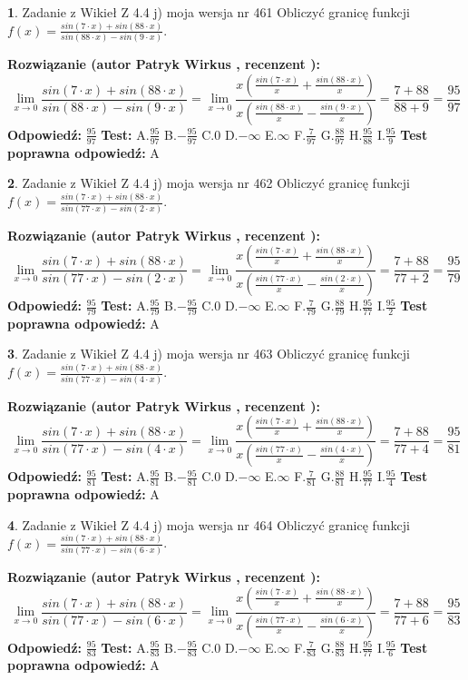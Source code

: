 \documentclass[12pt, a4paper]{article}
\theoremstyle{definition} %
\newtheorem{zad}{}
\newcommand{\zadStart}[1]{\begin{zad}#1\newline}
\newcommand{\zadStop}{\end{zad}}
\newcommand{\rozwStart}[2]{\noindent \textbf{Rozwiązanie (autor #1 , recenzent #2): }\newline}
\newcommand{\rozwStop}{\newline}
\newcommand{\odpStart}{\noindent \textbf{Odpowiedź:}\newline}
\newcommand{\odpStop}{\newline}
\newcommand{\testStart}{\noindent \textbf{Test:}\newline}
\newcommand{\testStop}{\newline}
\newcommand{\kluczStart}{\noindent \textbf{Test poprawna odpowiedź:}\newline}
\newcommand{\kluczStop}{\newline}
\begin{document}
\zadStart{Zadanie z Wikieł Z 4.4 j) moja wersja nr 461}
Obliczyć granicę funkcji $f(x)=\frac{sin(7\cdot x) +sin(88\cdot x)}{sin(88\cdot x) -sin(9\cdot x)}$.
\zadStop
\rozwStart{Patryk Wirkus}{}
$$\lim\limits_{x\to 0}\frac{sin(7\cdot x) +sin(88\cdot x)}{sin(88\cdot x) -sin(9\cdot x)}=\lim\limits_{x\to 0}\frac{x(\frac{sin(7\cdot x)}{x}+\frac{sin(88\cdot x)}{x})}{x(\frac{sin(88\cdot x)}{x}-\frac{sin(9\cdot x)}{x})}=\frac{7+88}{88+9} = \frac{95}{97}$$
\rozwStop
\odpStart
$\frac{95}{97}$
\odpStop
\testStart
A.$\frac{95}{97}$
B.$-\frac{95}{97}$
C.$0$
D.$-\infty$
E.$\infty$
F.$\frac{7}{97}$
G.$\frac{88}{97}$
H.$\frac{95}{88}$
I.$\frac{95}{9}$
\testStop
\kluczStart
A
\kluczStop



\zadStart{Zadanie z Wikieł Z 4.4 j) moja wersja nr 462}
Obliczyć granicę funkcji $f(x)=\frac{sin(7\cdot x) +sin(88\cdot x)}{sin(77\cdot x) -sin(2\cdot x)}$.
\zadStop
\rozwStart{Patryk Wirkus}{}
$$\lim\limits_{x\to 0}\frac{sin(7\cdot x) +sin(88\cdot x)}{sin(77\cdot x) -sin(2\cdot x)}=\lim\limits_{x\to 0}\frac{x(\frac{sin(7\cdot x)}{x}+\frac{sin(88\cdot x)}{x})}{x(\frac{sin(77\cdot x)}{x}-\frac{sin(2\cdot x)}{x})}=\frac{7+88}{77+2} = \frac{95}{79}$$
\rozwStop
\odpStart
$\frac{95}{79}$
\odpStop
\testStart
A.$\frac{95}{79}$
B.$-\frac{95}{79}$
C.$0$
D.$-\infty$
E.$\infty$
F.$\frac{7}{79}$
G.$\frac{88}{79}$
H.$\frac{95}{77}$
I.$\frac{95}{2}$
\testStop
\kluczStart
A
\kluczStop



\zadStart{Zadanie z Wikieł Z 4.4 j) moja wersja nr 463}
Obliczyć granicę funkcji $f(x)=\frac{sin(7\cdot x) +sin(88\cdot x)}{sin(77\cdot x) -sin(4\cdot x)}$.
\zadStop
\rozwStart{Patryk Wirkus}{}
$$\lim\limits_{x\to 0}\frac{sin(7\cdot x) +sin(88\cdot x)}{sin(77\cdot x) -sin(4\cdot x)}=\lim\limits_{x\to 0}\frac{x(\frac{sin(7\cdot x)}{x}+\frac{sin(88\cdot x)}{x})}{x(\frac{sin(77\cdot x)}{x}-\frac{sin(4\cdot x)}{x})}=\frac{7+88}{77+4} = \frac{95}{81}$$
\rozwStop
\odpStart
$\frac{95}{81}$
\odpStop
\testStart
A.$\frac{95}{81}$
B.$-\frac{95}{81}$
C.$0$
D.$-\infty$
E.$\infty$
F.$\frac{7}{81}$
G.$\frac{88}{81}$
H.$\frac{95}{77}$
I.$\frac{95}{4}$
\testStop
\kluczStart
A
\kluczStop



\zadStart{Zadanie z Wikieł Z 4.4 j) moja wersja nr 464}
Obliczyć granicę funkcji $f(x)=\frac{sin(7\cdot x) +sin(88\cdot x)}{sin(77\cdot x) -sin(6\cdot x)}$.
\zadStop
\rozwStart{Patryk Wirkus}{}
$$\lim\limits_{x\to 0}\frac{sin(7\cdot x) +sin(88\cdot x)}{sin(77\cdot x) -sin(6\cdot x)}=\lim\limits_{x\to 0}\frac{x(\frac{sin(7\cdot x)}{x}+\frac{sin(88\cdot x)}{x})}{x(\frac{sin(77\cdot x)}{x}-\frac{sin(6\cdot x)}{x})}=\frac{7+88}{77+6} = \frac{95}{83}$$
\rozwStop
\odpStart
$\frac{95}{83}$
\odpStop
\testStart
A.$\frac{95}{83}$
B.$-\frac{95}{83}$
C.$0$
D.$-\infty$
E.$\infty$
F.$\frac{7}{83}$
G.$\frac{88}{83}$
H.$\frac{95}{77}$
I.$\frac{95}{6}$
\testStop
\kluczStart
A
\kluczStop
\end{document}

